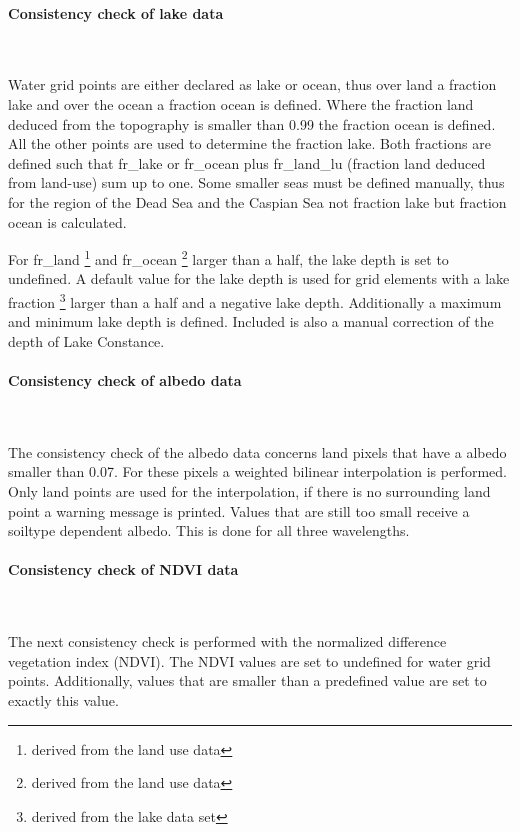 \documentclass[a4paper,10pt,DIV14,BCOR1cm,titlepage,twoside]{scrartcl}
\begin{document}
\paragraph{Consistency check of lake data}\ \par\medskip\noindent
Water grid points are either declared as lake or ocean, thus over land a fraction lake and over the ocean a fraction ocean is defined. Where the fraction land deduced from the topography is smaller than 0.99 the fraction ocean is defined. All the other points are used to determine the fraction lake. Both fractions are defined such that fr\_lake or fr\_ocean plus fr\_land\_lu (fraction land deduced from land-use) sum up to one. Some smaller seas must be defined manually, thus for the region of the Dead Sea and the Caspian Sea not fraction lake but fraction ocean is calculated.\par\medskip\noindent
For fr\_land \footnote{derived from the land use data} and fr\_ocean \footnote{derived from the land use data} larger than a half, the lake depth is set to undefined. A default value for the lake depth is used for grid elements with a lake fraction \footnote{derived from the lake data set} larger than a half and a negative lake depth. Additionally a maximum and minimum lake depth is defined. Included is also a manual correction of the depth of Lake Constance.\par\medskip\noindent
\paragraph{Consistency check of albedo data}\ \par\medskip\noindent
The consistency check of the albedo data concerns land pixels that have a albedo smaller than 0.07. For these pixels a weighted bilinear interpolation is performed. Only land points are used for the interpolation, if there is no surrounding land point a warning message is printed. Values that are still too small receive a soiltype dependent albedo. This is done for all three wavelengths.
\paragraph{Consistency check of NDVI data}\ \par\medskip\noindent
The next consistency check is performed with the normalized difference vegetation index (NDVI). The NDVI values are set to undefined for water grid points. Additionally, values that are smaller than a predefined value are set to exactly this value.\par\medskip\noindent
\end{document}
